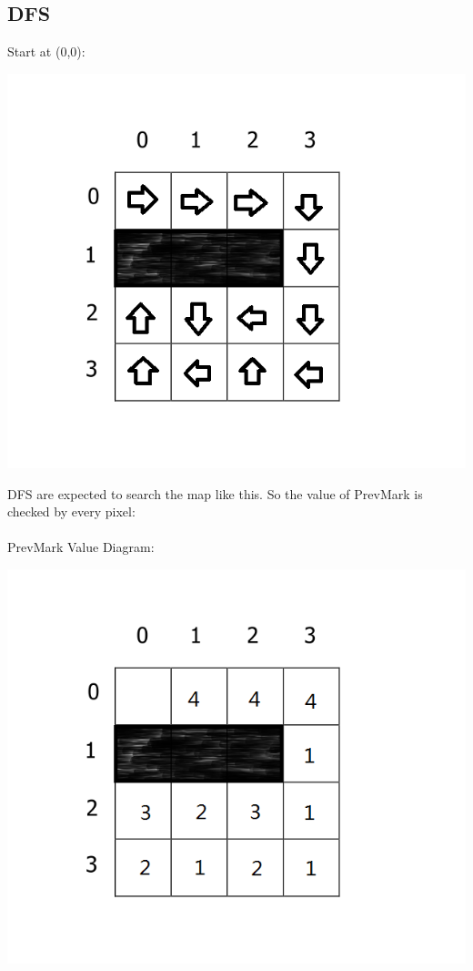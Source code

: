 \documentclass[11pt, a4paper]{report}
\begin{document}
\subsection{DFS}
Start at (0,0):
\begin{center}
\includegraphics[scale=0.4]{./image/Test4DFS.png}
\end{center}
DFS are expected to search the map like this. So the value of PrevMark is checked by every pixel:\\

\paragraph{}PrevMark Value Diagram:
\begin{center}
\includegraphics[scale=0.4]{./image/Test4DFSP.png}
\end{center}
\end{document}
